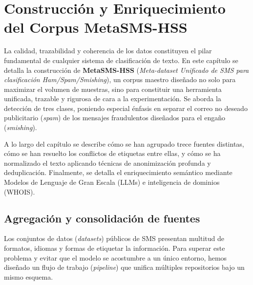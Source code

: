 \chapter{Construcción y Enriquecimiento del Corpus MetaSMS-HSS}
\label{dataset}

La calidad, trazabilidad y coherencia de los datos constituyen el pilar fundamental de cualquier sistema de clasificación de texto. En este capítulo se detalla la construcción de \textbf{MetaSMS-HSS} (\textit{Meta-dataset Unificado de SMS para clasificación Ham/Spam/Smishing}), un corpus maestro diseñado no solo para maximizar el volumen de muestras, sino para constituir una herramienta unificada, trazable y rigurosa de cara a la experimentación. Se aborda la detección de tres clases, poniendo especial énfasis en separar el correo no deseado publicitario (\textit{spam}) de los mensajes fraudulentos diseñados para el engaño (\textit{smishing}).

A lo largo del capítulo se describe cómo se han agrupado trece fuentes distintas, cómo se han resuelto los conflictos de etiquetas entre ellas, y cómo se ha normalizado el texto aplicando técnicas de anonimización profunda y deduplicación. Finalmente, se detalla el enriquecimiento semántico mediante Modelos de Lenguaje de Gran Escala (\glspl{LLM}) e inteligencia de dominios (WHOIS).

\section{Agregación y consolidación de fuentes}
\label{sec:recopilacion}

Los conjuntos de datos (\textit{datasets}) públicos de SMS presentan multitud de formatos, idiomas y formas de etiquetar la información. Para superar este problema y evitar que el modelo se acostumbre a un único entorno, hemos diseñado un flujo de trabajo (\textit{pipeline}) que unifica múltiples repositorios bajo un mismo esquema.


